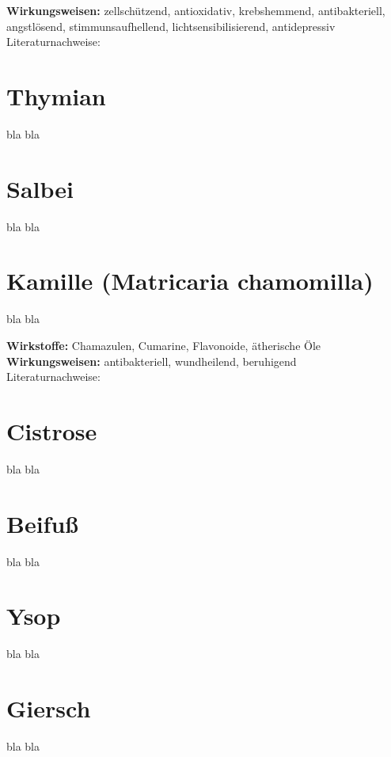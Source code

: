 \textbf{Wirkungsweisen:} zellschützend, antioxidativ, krebshemmend, antibakteriell, angstlösend, stimmunsaufhellend, lichtsensibilisierend, antidepressiv\\

Literaturnachweise: \cite{nedoma2018heilsalben}

\section{Thymian}

bla bla

\section{Salbei}

bla bla

\section{Kamille (Matricaria chamomilla)}

bla bla

\textbf{Wirkstoffe:} Chamazulen, Cumarine, Flavonoide, ätherische Öle\\

\textbf{Wirkungsweisen:} antibakteriell, wundheilend, beruhigend\\

Literaturnachweise: \cite{nedoma2018heilsalben}

\section{Cistrose}

bla bla

\section{Beifuß}

bla bla

\section{Ysop}

bla bla

\section{Giersch}

bla bla

